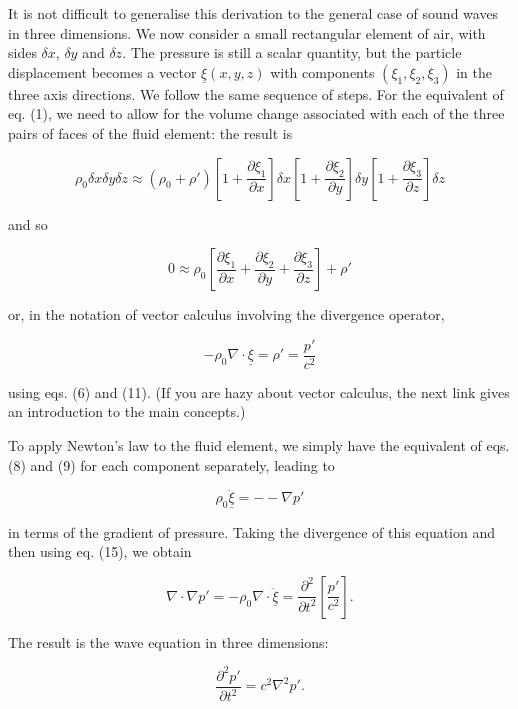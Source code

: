   It is not difficult to generalise this derivation to the general case of 
  sound waves in three dimensions. We now consider a small rectangular element 
  of air, with sides $\delta x$, $\delta y$ and $\delta z$. The pressure is 
  still a scalar quantity, but the particle displacement becomes a vector 
  $\underline{\xi}(x,y,z)$ with components $(\xi_1,\xi_2,\xi_3) $ in the three 
  axis directions. We follow the same sequence of steps. For the equivalent of 
  eq. (1), we need to allow for the volume change associated with each of the 
  three pairs of faces of the fluid element: the result is 

  $$\rho_0 \delta x \delta y \delta z \approx (\rho_0 + \rho') \left[1 + 
  \frac{\partial \xi_1}{\partial x} \right] \delta x \left[1 + \frac{\partial 
  \xi_2}{\partial y} \right] \delta y \left[1 + \frac{\partial \xi_3}{\partial 
  z} \right] \delta z \tag{13}$$ 

  and so 

  $$0 \approx \rho_0 \left[\frac{\partial \xi_1}{\partial x} + \frac{\partial 
  \xi_2}{\partial y} + \frac{\partial \xi_3}{\partial z} \right] + \rho' 
  \tag{14}$$ 

  or, in the notation of vector calculus involving the divergence operator, 

  $$-\rho_0 \nabla \cdot \underline{\xi} = \rho' = \frac{p'}{c^2} \tag{15}$$ 

  using eqs. (6) and (11). (If you are hazy about vector calculus, the next 
  link gives an introduction to the main concepts.) 

  To apply Newton's law to the fluid element, we simply have the equivalent of 
  eqs. (8) and (9) for each component separately, leading to 

  $$\rho_0 \ddot{\underline{\xi}} = -- \nabla p' \tag{16}$$ 

  in terms of the gradient of pressure. Taking the divergence of this equation 
  and then using eq. (15), we obtain 

  $$\nabla \cdot \nabla p' = -\rho_0 \nabla \cdot \ddot{\underline{\xi}} = 
  \frac{\partial^2}{\partial t^2} \left[ \frac{p'}{c^2} \right] . \tag{17}$$ 

  The result is the wave equation in three dimensions: 

  $$\frac{\partial^2 p'}{\partial t^2} = c^2 \nabla^2 p' .\tag{18}$$ 